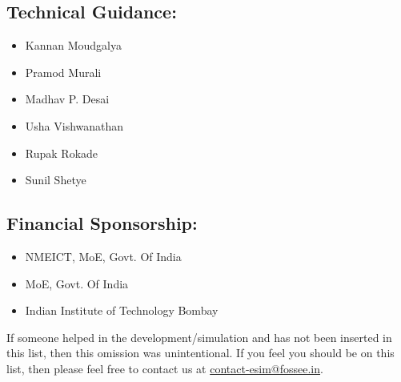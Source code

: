\subsection*{Technical Guidance:}
\begin{multicols}{3}
\begin{itemize}
    \item Kannan Moudgalya
    \item Pramod Murali
    \item Madhav P. Desai
    \item Usha Vishwanathan
    \item Rupak Rokade
    \item Sunil Shetye
\end{itemize}
\end{multicols}
\subsection*{Financial Sponsorship:}
\begin{multicols}{2}
\begin{itemize}
    \item NMEICT, MoE, Govt. Of India
    \item MoE, Govt. Of India
    \item Indian Institute of Technology Bombay
    
\end{itemize}
\end{multicols}

If someone helped in the development/simulation and has not been inserted in this list, then this omission was unintentional. If you feel you should be on this list, then please feel free to contact us at \href{mailto:contact-esim@fossee.in}{contact-esim@fossee.in}. %
